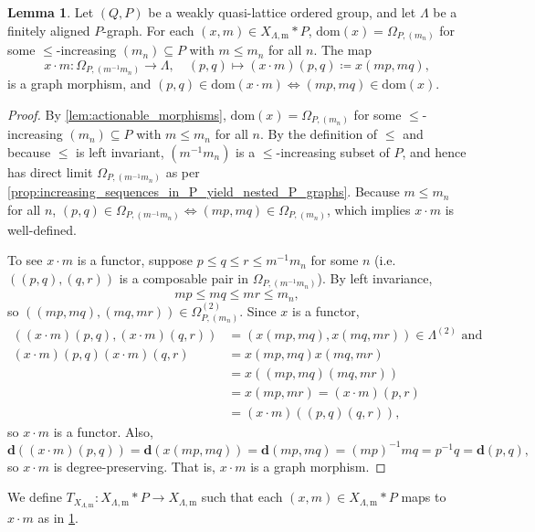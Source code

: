 \documentclass[11pt]{amsart}
\theoremstyle{definition}
\numberwithin{thm}{section}
\numberwithin{equation}{section}
\newtheorem{lemma}[thm]{Lemma}
\newcommand{\degree}{\mathbf{d}}
\newcommand{\morphdom}[1]{\mathrm{dom}(#1)}
\newcommand{\M}{\mathrm{m}}
\newcommand{\PS}[2]{X_{#2, #1}}
\newcommand{\RPA}[2]{#1 \cdot #2}
\newcommand{\composablepairs}[1]{#1^{(2)}}
\begin{document}
\begin{lemma}
\label{lem:action_on_PS_of_morphisms}
Let $(Q, P)$ be a weakly quasi-lattice ordered group, and let $\Lambda$ be a finitely aligned $P$-graph. 
For each $(x, m) \in \PS{\M}{\Lambda} * P$, $\morphdom{x} = \Omega_{P, (m_n)}$ for some $\leq$-increasing $(m_n) \subseteq P$ with $m \leq m_n$ for all $n$.
The map
\[
\RPA{x}{m} \colon \Omega_{P, (m^{-1}m_n)} \to \Lambda, \quad 
(p, q) \mapsto (\RPA{x}{m})(p, q) \coloneqq x(mp, mq),
\]
is a graph morphism, and $(p, q) \in \morphdom{\RPA{x}{m}} \iff (mp, mq) \in \morphdom{x}$.
\end{lemma}
\begin{proof}
By \cref{lem:actionable_morphisms}, $\morphdom{x} = \Omega_{P, (m_n)}$ for some $\leq$-increasing $(m_n) \subseteq P$ with $m \leq m_n$ for all $n$.
By the definition of $\leq$ and because $\leq$ is left invariant, $(m^{-1}m_n)$ is a $\leq$-increasing subset of $P$, and hence has direct limit $\Omega_{P, (m^{-1}m_n)}$ as per \cref{prop:increasing_sequences_in_P_yield_nested_P_graphs}. 
Because $m \leq m_n$ for all $n$, $(p, q) \in \Omega_{P, (m^{-1}m_n)} \iff (mp, mq) \in \Omega_{P, (m_n)}$, which implies $\RPA{x}{m}$ is well-defined.

To see $\RPA{x}{m}$ is a functor, suppose $p \leq q \leq r \leq m^{-1}m_n$ for some $n$ (i.e. $((p, q), (q, r))$ is a composable pair in $\Omega_{P, (m^{-1}m_n)}$). 
By left invariance, 
\[
mp \leq mq \leq mr \leq m_n,
\] 
so $((mp, mq), (mq, mr)) \in \composablepairs{\Omega_{P, (m_n)}}$. 
Since $x$ is a functor, 
\begin{align*}
((\RPA{x}{m})(p, q), (\RPA{x}{m})(q, r)) 
&= (x(mp, mq), x(mq, mr)) \in \composablepairs{\Lambda} 
\text{ and } \\
(\RPA{x}{m})(p, q)(\RPA{x}{m})(q, r) 
&= x(mp, mq)x(mq, mr) \\ 
&= x((mp, mq)(mq, mr)) \\ 
&= x(mp, mr) = (\RPA{x}{m})(p, r) \\
&= (\RPA{x}{m})((p, q)(q, r)),
\end{align*} 
so $\RPA{x}{m}$ is a functor.
Also, 
\[
\degree((\RPA{x}{m})(p, q)) 
= \degree(x(mp, mq)) 
= \degree(mp, mq) 
= (mp)^{-1}mq 
= p^{-1}q 
= \degree(p, q),
\] 
so $\RPA{x}{m}$ is degree-preserving. 
That is, $\RPA{x}{m}$ is a graph morphism.
\end{proof}

We define $T_{\PS{\M}{\Lambda}} \colon \PS{\M}{\Lambda} * P \to \PS{\M}{\Lambda}$ such that each $(x, m) \in \PS{\M}{\Lambda} * P$ maps to $\RPA{x}{m}$ as in \cref{lem:action_on_PS_of_morphisms}.
\end{document}
